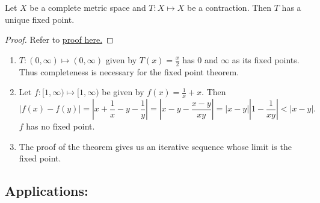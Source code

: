 \documentclass{functionspaces}
\begin{document}
\begin{theorem}
Let $X$ be a complete metric space and $T:X\mapsto X$ be a contraction. Then $T$ has a unique fixed point.
\end{theorem}

\begin{proof}
Refer to \href{https://en.wikipedia.org/wiki/Banach_fixed-point_theorem#Proof}{proof here.} 
\end{proof}

\begin{remark}
\begin{enumerate}
\item $T:(0,\infty)\mapsto(0,\infty)$ given by $T(x)=\frac{x}{2}$ has $0$ and $\infty$ as its fixed points. Thus completeness is necessary for the fixed point theorem.
\item Let $f:[1,\infty)\mapsto[1,\infty)$ be given by $f(x)=\frac{1}{x}+x$. Then
\[
|f(x)-f(y)|=\left|x+\frac{1}{x}-y-\frac{1}{y}\right|=\left|x-y-\frac{x-y}{xy}\right|=|x-y|\left|1-\frac{1}{xy}\right|<|x-y|.
\]
$f$ has no fixed point.
\item The proof of the theorem gives us an iterative sequence whose limit is the fixed point.
\end{enumerate}
\end{remark}

\subsection{Applications:}
\end{document}

